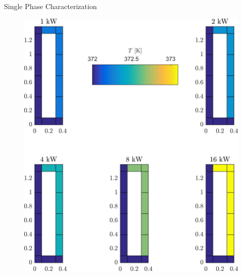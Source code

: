 \documentclass[10pt,t,xcolor=table,compress]{UWMadBeamer}
\begin{document}
\begin{frame}{Single Phase Characterization}
{\begin{figure}
                \includegraphics[scale=0.083]{Distribution_Temperarture-372K-1Phi}%
            \end{figure}
        }
\end{frame}
\end{document}
